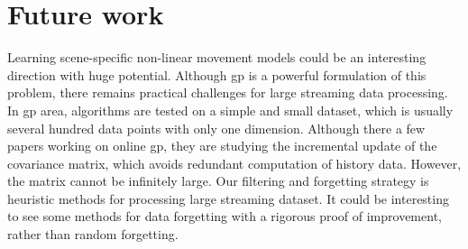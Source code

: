 \section{Future work}

Learning scene-specific non-linear movement models could be an interesting direction with huge potential. 
Although \gls{gp} is a powerful formulation of this problem, there remains practical challenges for large streaming data processing.
In \gls{gp} area, algorithms are tested on a simple and small dataset, which is usually several hundred data points with only one dimension.
Although there a few papers working on online \gls{gp}, they are studying the incremental update of the covariance matrix, which avoids redundant computation of history data.
However, the matrix cannot be infinitely large.
Our filtering and forgetting strategy is heuristic methods for processing large streaming dataset.
It could be interesting to see some methods for data forgetting with a rigorous proof of improvement, rather than random forgetting. 